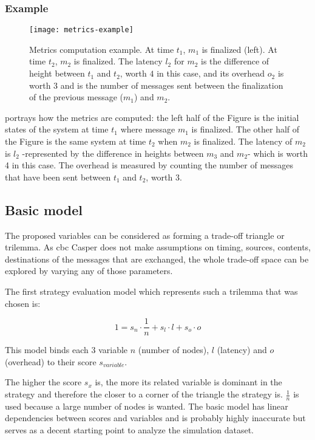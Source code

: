 \subsubsection{Example}

\begin{figure}[h]
	\centering
	\texttt{[image: metrics-example]}
    \caption{Metrics computation example. At time \(t_1\), \(m_1\) is finalized
    (left). At time \(t_2\), \(m_2\) is finalized. The latency \(l_2\) for \(m_2\) is the difference
    of height between \(t_1\) and \(t_2\), worth \(4\) in this case, and its
    overhead \(o_2\) is worth \(3\) and is the number of messages sent between the
    finalization of the previous message (\(m_1\)) and \(m_2\).}
	\label{fig:metricsSchema}
\end{figure}

 portrays how the metrics are computed: the left half of
the Figure is the initial states of the system at time \(t_1\) where message
\(m_1\) is finalized. The other half of the Figure is the same system at time
\(t_2\) when \(m_2\) is finalized. The latency of \(m_2\) is \(l_2\)
-represented by the difference in heights between \(m_3\) and \(m_2\)- which is
worth 4 in this case. The overhead is measured by counting the number of
messages that have been sent between \(t_1\) and \(t_2\), worth 3.

\FloatBarrier

\subsection{Basic model}
\label{ssec:model}
The proposed variables can be considered as forming a trade-off triangle or trilemma.
As \gls{cbc} Casper does not make assumptions on timing, sources, contents,
destinations of the messages that are exchanged, the whole trade-off space can
be explored by varying any of those parameters.

The first strategy evaluation model which represents such a trilemma that was
chosen is:

\[1 = s_n \cdot \frac{1}{n} + s_l\cdot l + s_o\cdot o\]


This model binds each 3 variable \(n\) (number of nodes), \(l\) (latency) and
\(o\) (overhead) to their score \(s_{variable}\).

The higher the score \(s_x\) is, the more its related variable is dominant in
the strategy and therefore the closer to a corner of the triangle the strategy
is.  \(\frac{1}{n}\) is used because a large number of nodes is wanted.  The
basic model has linear dependencies between scores and variables and is probably
highly inaccurate but serves as a decent starting point to analyze the
simulation dataset.

